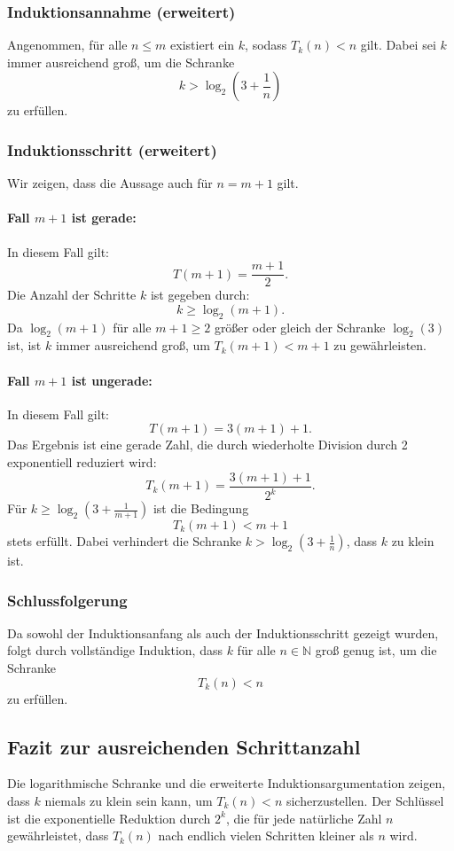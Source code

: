 \documentclass[a4paper,12pt]{article}
\begin{document}
\subsubsection{Induktionsannahme (erweitert)}
Angenommen, für alle \( n \leq m \) existiert ein \( k \), sodass \( T_k(n) < n \) gilt. Dabei sei \( k \) immer ausreichend groß, um die Schranke
\[
k > \log_2\left(3 + \frac{1}{n}\right)
\]
zu erfüllen.

\subsubsection{Induktionsschritt (erweitert)}
Wir zeigen, dass die Aussage auch für \( n = m + 1 \) gilt.

\paragraph{Fall \( m + 1 \) ist gerade:}
In diesem Fall gilt:
\[
T(m + 1) = \frac{m + 1}{2}.
\]
Die Anzahl der Schritte \( k \) ist gegeben durch:
\[
k \geq \log_2(m + 1).
\]
Da \(\log_2(m + 1)\) für alle \( m + 1 \geq 2 \) größer oder gleich der Schranke \(\log_2(3)\) ist, ist \( k \) immer ausreichend groß, um \( T_k(m + 1) < m + 1 \) zu gewährleisten.

\paragraph{Fall \( m + 1 \) ist ungerade:}
In diesem Fall gilt:
\[
T(m + 1) = 3(m + 1) + 1.
\]
Das Ergebnis ist eine gerade Zahl, die durch wiederholte Division durch 2 exponentiell reduziert wird:
\[
T_k(m + 1) = \frac{3(m + 1) + 1}{2^k}.
\]
Für \( k \geq \log_2\left(3 + \frac{1}{m + 1}\right) \) ist die Bedingung
\[
T_k(m + 1) < m + 1
\]
stets erfüllt. Dabei verhindert die Schranke \( k > \log_2\left(3 + \frac{1}{n}\right) \), dass \( k \) zu klein ist.

\subsubsection{Schlussfolgerung}
Da sowohl der Induktionsanfang als auch der Induktionsschritt gezeigt wurden, folgt durch vollständige Induktion, dass \( k \) für alle \( n \in \mathbb{N} \) groß genug ist, um die Schranke
\[
T_k(n) < n
\]
zu erfüllen.

\subsection{Fazit zur ausreichenden Schrittanzahl}
Die logarithmische Schranke und die erweiterte Induktionsargumentation zeigen, dass \( k \) niemals zu klein sein kann, um \( T_k(n) < n \) sicherzustellen. Der Schlüssel ist die exponentielle Reduktion durch \( 2^k \), die für jede natürliche Zahl \( n \) gewährleistet, dass \( T_k(n) \) nach endlich vielen Schritten kleiner als \( n \) wird.
\end{document}
